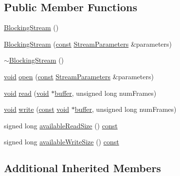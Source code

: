 \subsection*{Public Member Functions}
\begin{DoxyCompactItemize}
\item 
\hyperlink{classportaudio_1_1_blocking_stream_a3f8ebe1d69bdb7404dc31a82ed92c75f}{Blocking\+Stream} ()
\item 
\hyperlink{classportaudio_1_1_blocking_stream_a570d9cdf871415cfd30a2a5f04dc2aa6}{Blocking\+Stream} (\hyperlink{getopt1_8c_a2c212835823e3c54a8ab6d95c652660e}{const} \hyperlink{classportaudio_1_1_stream_parameters}{Stream\+Parameters} \&parameters)
\item 
\hyperlink{classportaudio_1_1_blocking_stream_a1e5fd91291bd9ddc11230af99807cf52}{$\sim$\+Blocking\+Stream} ()
\item 
\hyperlink{sound_8c_ae35f5844602719cf66324f4de2a658b3}{void} \hyperlink{classportaudio_1_1_blocking_stream_a8a2667b58c73636709a1794d33bd51ec}{open} (\hyperlink{getopt1_8c_a2c212835823e3c54a8ab6d95c652660e}{const} \hyperlink{classportaudio_1_1_stream_parameters}{Stream\+Parameters} \&parameters)
\item 
\hyperlink{sound_8c_ae35f5844602719cf66324f4de2a658b3}{void} \hyperlink{classportaudio_1_1_blocking_stream_ada24f8f708601f135b02eb2b79eb99e8}{read} (\hyperlink{sound_8c_ae35f5844602719cf66324f4de2a658b3}{void} $\ast$\hyperlink{structbuffer}{buffer}, unsigned long num\+Frames)
\item 
\hyperlink{sound_8c_ae35f5844602719cf66324f4de2a658b3}{void} \hyperlink{classportaudio_1_1_blocking_stream_a1d64d957903a522ada1e834412cad3df}{write} (\hyperlink{getopt1_8c_a2c212835823e3c54a8ab6d95c652660e}{const} \hyperlink{sound_8c_ae35f5844602719cf66324f4de2a658b3}{void} $\ast$\hyperlink{structbuffer}{buffer}, unsigned long num\+Frames)
\item 
signed long \hyperlink{classportaudio_1_1_blocking_stream_aa4794c9d3ee23db33d1da67ba4b2ead5}{available\+Read\+Size} () \hyperlink{getopt1_8c_a2c212835823e3c54a8ab6d95c652660e}{const} 
\item 
signed long \hyperlink{classportaudio_1_1_blocking_stream_a9a003e36a5510bfa025e1e708b0aaa5e}{available\+Write\+Size} () \hyperlink{getopt1_8c_a2c212835823e3c54a8ab6d95c652660e}{const} 
\end{DoxyCompactItemize}
\subsection*{Additional Inherited Members}


